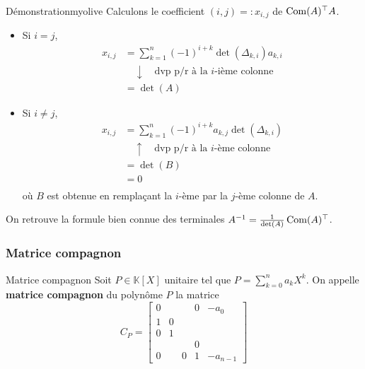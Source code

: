     \begin{demo}{Démonstration}{myolive}
        Calculons le coefficient $(i,j) =: x_{i,j}$ de $\operatorname{Com}(A)^{\top} A$.
        \begin{itemize}
            \item Si $i= j$, 
            \begin{align*}
                x_{i,j} 
                &= \sum_{k=1}^{n} (-1)^{i + k} \det(\Delta_{k,i}) a_{k,i} \\
                &\quad \downarrow \quad \text{dvp p/r à la } i\text{-ième colonne} \\
                &= \det(A) 
            \end{align*}
            \item Si $i \neq j$, 
            \begin{align*}
                x_{i,j} 
                &= \sum_{k=1}^{n} (-1)^{i + k} a_{k,j} \det(\Delta_{k,i}) \\
                &\quad \uparrow \quad \text{dvp p/r à la } i\text{-ème colonne} \\
                &= \det(B) \\
                &= 0 \\
            \end{align*}
            où $B$ est obtenue en remplaçant la $i$-ème par la $j$-ème colonne de $A$.
        \end{itemize}
    \end{demo}

    On retrouve la formule bien connue des terminales $A^{-1} = \frac{1}{\operatorname{det}(A)} \operatorname{Com}(A)^{\top}$.

    \subsubsection{Matrice compagnon}

    \begin{defi}{Matrice compagnon}{}
        Soit $P \in \mathbb{K}[X]$ unitaire tel que $P = \sum_{k=0}^{n} a_k X^k$. On appelle \textbf{matrice compagnon} du polynôme $P$ la matrice 
        \[ C_P = \begin{bmatrix}
            0 & & & 0 & -a_0 \\
            1 & 0 & & & \\
            0 & 1 & & & \\
            & & & 0 & \\
            0 & & 0 & 1 & -a_{n-1}
        \end{bmatrix} \] 
    \end{defi}

